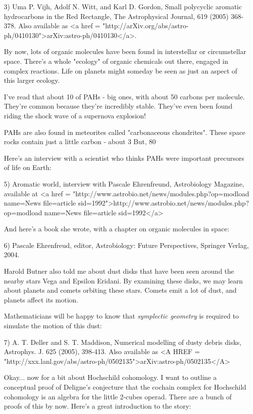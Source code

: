 3) Uma P. Vijh, Adolf N. Witt, and Karl D. Gordon, Small polycyclic 
aromatic hydrocarbons in the Red Rectangle, The Astrophysical 
Journal, 619 (2005) 368-378.  Also available as 
<a href = "http://arXiv.org/abs/astro-ph/0410130">arXiv:astro-ph/0410130</a>.

By now, lots of organic molecules have been found in interstellar 
or circumstellar space.  There's a whole "ecology" of organic 
chemicals out there, engaged in complex reactions.  Life on planets
might someday be seen as just an aspect of this larger ecology.  

I've read that about 10%
of PAHs - big ones, with about 50 carbons per molecule.  They're 
common because they're incredibly stable.  They've even been found 
riding the shock wave of a supernova explosion!

PAHs are also found in meteorites called "carbonaceous chondrites".  
These space rocks contain just a little carbon - about 3%
But, 80%

Here's an interview with a scientist who thinks PAHs were important 
precursors of life on Earth:

5) Aromatic world, interview with Pascale Ehrenfreund,
Astrobiology Magazine, available at
<a href = "http://www.astrobio.net/news/modules.php?op=modload\text{\&} name=News\text{\&} file=article\text{\&} sid=1992">http://www.astrobio.net/news/modules.php?op=modload\text{\&} name=News\text{\&} file=article\text{\&} sid=1992</a>

And here's a book she wrote, with a chapter on organic molecules 
in space:

6) Pascale Ehrenfreud, editor, Astrobiology: Future Perspectives,
Springer Verlag, 2004.

Harold Butner also told me about dust disks that have been seen around 
the nearby stars Vega and Epsilon Eridani.  By examining these disks, 
we may learn about planets and comets orbiting these stars.  Comets 
emit a lot of dust, and planets affect its motion.

Mathematicians will be happy to know that \emph{symplectic geometry}
is required to simulate the motion of this dust:

7) A. T. Deller and S. T. Maddison, Numerical modelling of 
dusty debris disks, Astrophys. J. 625 (2005), 398-413.
Also available as <A HREF = "http://xxx.lanl.gov/abs/astro-ph/0502135">arXiv:astro-ph/0502135</A>

Okay... now for a bit about Hochschild cohomology.   I want to
outline a conceptual proof of Deligne's conjecture that the cochain 
complex for Hochschild cohomology is an algebra for the little 
2-cubes operad.   There are a bunch of proofs of this by now.
Here's a great introduction to the story:

